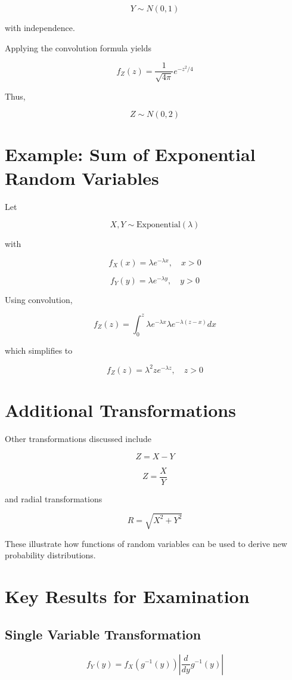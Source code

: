 \documentclass[11pt]{article}
\begin{document}
\[
Y \sim N(0,1)
\]

with independence.

Applying the convolution formula yields

\[
f_Z(z) =
\frac{1}{\sqrt{4\pi}}e^{-z^2/4}
\]

Thus,

\[
Z \sim N(0,2)
\]

\section{Example: Sum of Exponential Random Variables}

Let

\[
X,Y \sim \text{Exponential}(\lambda)
\]

with

\[
f_X(x) = \lambda e^{-\lambda x}, \quad x>0
\]

\[
f_Y(y) = \lambda e^{-\lambda y}, \quad y>0
\]

Using convolution,

\[
f_Z(z) =
\int_0^z
\lambda e^{-\lambda x}
\lambda e^{-\lambda (z-x)} dx
\]

which simplifies to

\[
f_Z(z) =
\lambda^2 z e^{-\lambda z}, \quad z>0
\]

\section{Additional Transformations}

Other transformations discussed include

\[
Z = X - Y
\]

\[
Z = \frac{X}{Y}
\]

and radial transformations

\[
R = \sqrt{X^2 + Y^2}
\]

These illustrate how functions of random variables can be used to derive new probability distributions.

\section{Key Results for Examination}

\subsection{Single Variable Transformation}

\[
f_Y(y) =
f_X(g^{-1}(y))
\left|
\frac{d}{dy}g^{-1}(y)
\right|
\]
\end{document}
